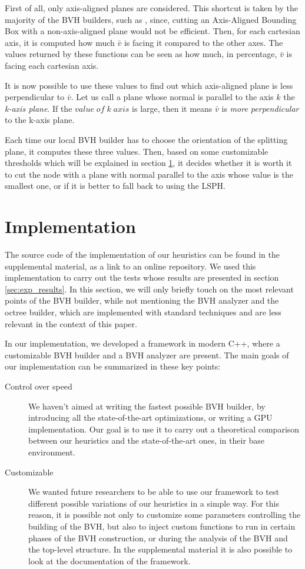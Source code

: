 \documentclass[acmtog, anonymous, review]{acmart}
\begin{document}
First of all, only axis-aligned planes are considered. This shortcut is taken by the majority of the BVH builders, such as \cite{embree}, since, cutting an Axis-Aligned Bounding Box with a non-axis-aligned plane would not be efficient. Then, for each cartesian axis, it is computed how much $\bar{v}$ is facing it compared to the other axes. The values returned by these functions can be seen as how much, in percentage, $\bar{v}$ is facing each cartesian axis.

It is now possible to use these values to find out which axis-aligned plane is less perpendicular to $\bar{v}$. Let us call a plane whose normal is parallel to the axis $k$ the \textit{k-axis plane}. If the $value\;of\;k\;axis$ is large, then it means $\bar{v}$ is \textit{more perpendicular} to the k-axis plane.

Each time our local BVH builder has to choose the orientation of the splitting plane, it computes these three values. Then, based on some customizable thresholds which will be explained in section \ref{sec:implementation}, it decides whether it is worth it to cut the node with a plane with normal parallel to the axis whose value is the smallest one, or if it is better to fall back to using the LSPH.

\section{Implementation} \label{sec:implementation}
The source code of the implementation of our heuristics can be found in the supplemental material, as a link to an online repository. We used this implementation to carry out the tests whose results are presented in section \ref{sec:exp_results}. In this section, we will only briefly touch on the most relevant points of the BVH builder, while not mentioning the BVH analyzer and the octree builder, which are implemented with standard techniques and are less relevant in the context of this paper.

In our implementation, we developed a framework in modern C++, where a customizable BVH builder and a BVH analyzer are present. The main goals of our implementation can be summarized in these key points:

\begin{description}
  \item[Control over speed] We haven't aimed at writing the fastest possible BVH builder, by introducing all the state-of-the-art optimizations, or writing a GPU implementation. Our goal is to use it to carry out a theoretical comparison between our heuristics and the state-of-the-art ones, in their base environment.
  \item[Customizable] We wanted future researchers to be able to use our framework to test different possible variations of our heuristics in a simple way. For this reason, it is possible not only to customize some parameters controlling the building of the BVH, but also to inject custom functions to run in certain phases of the BVH construction, or during the analysis of the BVH and the top-level structure. In the supplemental material it is also possible to look at the documentation of the framework.  
\end{description}
\end{document}
